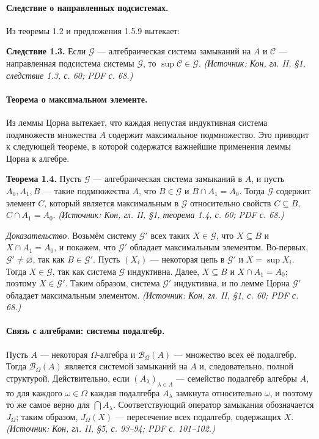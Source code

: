\documentclass[a4paper,12pt]{article}
\begin{document}
\paragraph{Следствие о направленных подсистемах.}
Из теоремы 1.2 и предложения 1.5.9 вытекает:

\textbf{Следствие 1.3.} Если \(\mathcal{G}\) — алгебраическая система замыканий на \(A\) и \(\mathcal{C}\) — направленная подсистема системы \(\mathcal{G}\), то \(\sup\mathcal{C}\in\mathcal{G}\).
\textit{(Источник: Кон, гл. II, §1, следствие 1.3, с. 60; PDF с. 68.)}

\paragraph{Теорема о максимальном элементе.}
Из леммы Цорна вытекает, что каждая непустая индуктивная система подмножеств множества \(A\) содержит максимальное подмножество. Это приводит к следующей теореме, в которой содержатся важнейшие применения леммы Цорна к алгебре.

\textbf{Теорема 1.4.} Пусть \(\mathcal{G}\) — алгебраическая система замыканий в \(A\), и пусть \(A_0,A_1,B\) — такие подмножества \(A\), что \(B\in\mathcal{G}\) и \(B\cap A_1=A_0\). Тогда \(\mathcal{G}\) содержит элемент \(C\), который является максимальным в \(\mathcal{G}\) относительно свойств \(C\subseteq B\), \(C\cap A_1=A_0\).
\textit{(Источник: Кон, гл. II, §1, теорема 1.4, с. 60; PDF с. 68.)}

\emph{Доказательство.} Возьмём систему \(\mathcal{G}'\) всех таких \(X\in\mathcal{G}\), что \(X\subseteq B\) и \(X\cap A_1=A_0\), и покажем, что \(\mathcal{G}'\) обладает максимальным элементом. Во-первых, \(\mathcal{G}'\neq\varnothing\), так как \(B\in\mathcal{G}'\). Пусть \((X_i)\) — некоторая цепь в \(\mathcal{G}'\) и \(X=\sup X_i\). Тогда \(X\in\mathcal{G}\), так как система \(\mathcal{G}\) индуктивна. Далее, \(X\subseteq B\) и \(X\cap A_1=A_0\); поэтому \(X\in\mathcal{G}'\). Таким образом, система \(\mathcal{G}'\) индуктивна, и по лемме Цорна \(\mathcal{G}'\) обладает максимальным элементом.
\textit{(Источник: Кон, гл. II, §1, с. 60; PDF с. 68.)}

\paragraph{Связь с алгебрами: системы подалгебр.}
Пусть \(A\) — некоторая \(\Omega\)-алгебра и \(\mathcal{B}_\Omega(A)\) — множество всех её подалгебр. Тогда \(\mathcal{B}_\Omega(A)\) является системой замыканий на \(A\) и, следовательно, полной структурой. Действительно, если \((A_\lambda)_{\lambda\in\Lambda}\) — семейство подалгебр алгебры \(A\), то для каждого \(\omega\in\Omega\) каждая подалгебра \(A_\lambda\) замкнута относительно \(\omega\), и поэтому то же самое верно для \(\bigcap A_\lambda\). Соответствующий оператор замыкания обозначается \(J_\Omega\); таким образом, \(J_\Omega(X)\) — пересечение всех подалгебр, содержащих \(X\).
\textit{(Источник: Кон, гл. II, §5, с. 93--94; PDF с. 101--102.)}
\end{document}
